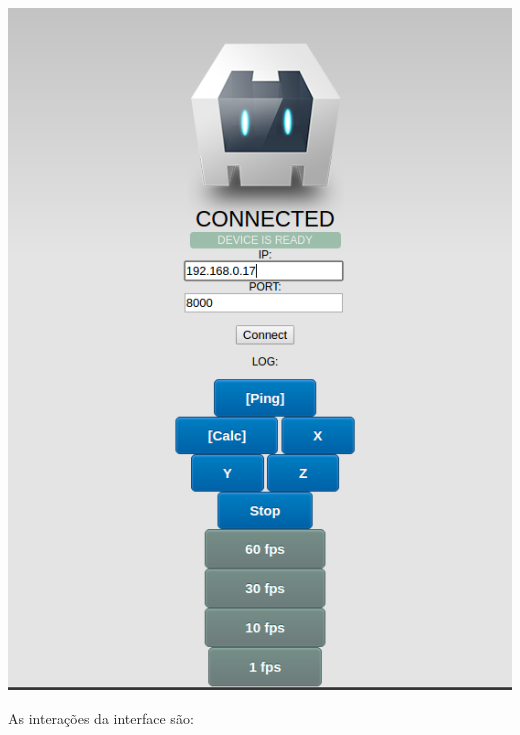 \documentclass[a4paper,12pt]{article}
\begin{document}
\newpage
\includegraphics[width=1\linewidth]{images/Cordova.png}
\newpage



As interações da interface são:
\end{document}
